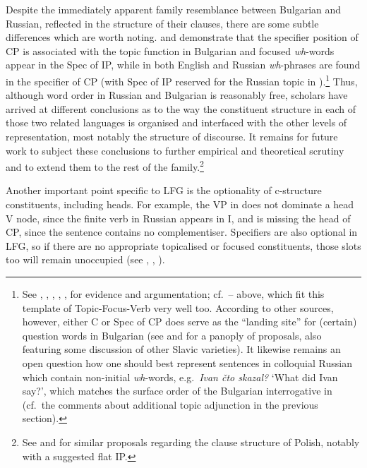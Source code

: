 \documentclass[output=paper,hidelinks]{langscibook}
\begin{document}
\largerpage
Despite the immediately apparent family resemblance between Bulgarian and Russian, reflected in the structure of their clauses, there are some subtle differences which are worth noting.  and  demonstrate that the specifier position of CP is associated with the topic function in Bulgarian and focused \textit{wh}{}-words appear in the Spec of IP, while in both English and Russian \textit{wh}{}-phrases are found in the specifier of CP (with Spec of IP reserved for the Russian topic in ).\footnote{See \citet[esp.\ 18ff.]{Rudin1985}, \citet[esp.\ Chapters 3, 5 and 10]{King95}, \citet[64, 73]{dalrymple01},  \citet[205ff.]{JaegerGerassimova2002}, \citet[124--125]{DLM:LFG}, for evidence and argumentation; cf.\ -- above, which fit this template of Topic-Focus-Verb very well too. According to other sources, however, either C or Spec of CP does serve as the ``landing site'' for (certain) question words in Bulgarian (see \citealt[83ff.]{Rudin1985} and \citealt[esp.\ 56--60, 120ff., 247--248]{King95} for a panoply of proposals, also featuring some discussion of other Slavic varieties). It likewise remains an open question how one should best represent sentences in colloquial Russian which contain non-initial \textit{wh}-words, e.g.\ \textit{Ivan čto skazal?} `What did Ivan say?', which matches the surface order of the Bulgarian interrogative in  (cf.\ the comments about additional topic adjunction in the previous section).} Thus, although word order in Russian and Bulgarian is reasonably free, scholars have arrived at different conclusions as to the way the constituent structure in each of those two related languages is organised and interfaced with the other levels of representation, most notably the structure of discourse. It remains for future work to subject these conclusions to further empirical and theoretical scrutiny and to extend them to the rest of the family.\footnote{See \citet{Patejuk2015} and \citet[329--330, 340--341]{PatejukPrzepiorkowski2017} for similar proposals regarding the clause structure of Polish, notably with a suggested flat IP.}

Another important point specific to LFG is the optionality of c-structure constituents, including heads. For example, the VP in  does not dominate a head V node, since the finite verb in Russian appears in I, and  is missing the head of CP, since the sentence contains no complementiser. Specifiers are also optional in LFG, so if there are no appropriate topicalised or focused constituents, those slots too will remain unoccupied (see \citealt[171--172]{King95}, \citealt[60, 63]{dalrymple01}, \citealt[107--108]{DLM:LFG}).
\end{document}
